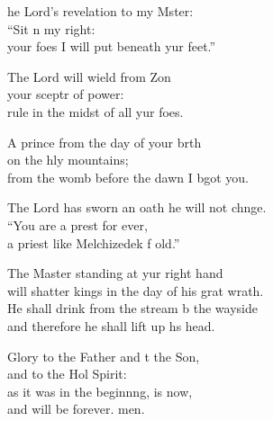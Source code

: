 \settowidth{\versewidth}{will shatter kings in the day of his great wrath.}
\begin{psalmverse}%
  \begin{patverse}
he Lord’s revelation to my Mster:\Flex\\
“Sit n my right:\Med\\
your foes I will put beneath yur feet.”

The Lord will wield from Z\pointup{\i}on\Flex\\
your sceptr of power:\Med\\
rule in the midst of all yur foes.

A prince from the day of your b\pointup{\i}rth\Flex\\
on the hly mountains;\Med\\
from the womb before the dawn I bgot you.

The Lord has sworn an oath he will not chnge.\Flex\\
“You are a pr\pointup{\i}est for ever,\Med\\
a priest like Melchizedek f old.”

The Master standing at yur right hand\Med\\
will shatter kings in the day of his grat wrath.\\
He shall drink from the stream b the wayside\Med\\
and therefore he shall lift up h\pointup{\i}s head.

Glory to the Father and t the Son,\Med\\
and to the Hol Spirit:\\
as it was in the beginn\pointup{\i}ng, is now,\Med\\
and will be forever. men.
  \end{patverse}
\end{psalmverse}

